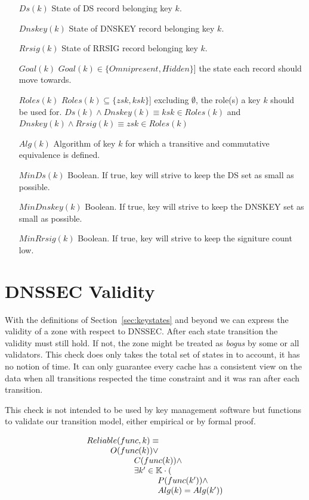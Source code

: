 \documentclass[twoside,english, a4paper]{article}
\begin{document}
\begin{itemize}
	\item[$Ds(k)$] State of DS record belonging key $k$.
	\item[$Dnskey(k)$] State of DNSKEY record belonging key $k$.
	\item[$Rrsig(k)$] State of RRSIG record belonging key $k$.
	\item[$Goal(k)$] $Goal(k) \in \{Omnipresent, Hidden\}$] the state each record
		should move towards.
	\item[$Roles(k)$] $Roles(k) \subseteq \{zsk,ksk\}$] excluding $\emptyset$, the 
		role(s) a key $k$ should be used for.
		$Ds(k) \wedge Dnskey(k) \equiv ksk \in Roles(k)$ and
		$Dnskey(k) \wedge Rrsig(k) \equiv zsk \in Roles(k)$
	\item[$Alg(k)$] Algorithm of key $k$ for which a transitive and 
		commutative equivalence is defined.
	\item[$MinDs(k)$] Boolean. If true, key will strive to keep the DS
			set as small as possible.
	\item[$MinDnskey(k)$] Boolean. If true, key will strive to keep the DNSKEY
			set as small as possible.
	\item[$MinRrsig(k)$] Boolean. If true, key will strive to keep the
			signiture count low.
\end{itemize}

\section{DNSSEC Validity} \label{validity}

With the definitions of Section~\ref{sec:keystates} and beyond we can
express the validity of a zone with respect to DNSSEC. After each state
transition the validity must still hold. If not, the zone might be treated as
\emph{bogus} by some or all validators. This check does only takes the 
total set of states in to account, it has no notion of time. It can
only guarantee every cache has a consistent view on the data when all
transitions respected the time constraint and it was ran after each
transition.

This check is not intended to be used by key management software but
functions to validate our transition model, either empirical or by 
formal proof.

\begin{equation}
\begin{array}{l}
Reliable(func, k) \equiv \\
\hskip 1cm 		O(func(k)) \vee \\
\hskip 2cm 			C(func(k)) \wedge \\
\hskip 2cm 			\exists k' \in \mathbb{K} \cdot (\\
\hskip 3cm 				P(func(k')) \wedge \\
\hskip 3cm 				Alg(k)=Alg(k'))
\end{array}
\end{equation}
\end{document}
